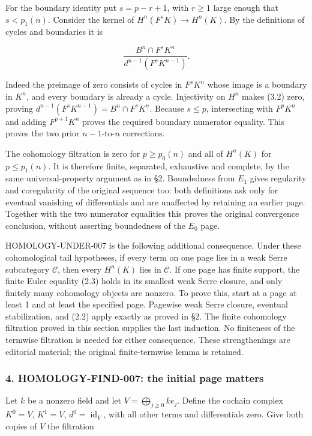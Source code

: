 \documentclass[11pt]{article}
\begin{document}
For the boundary identity put \(s=p-r+1\), with \(r\geq1\) large enough that \(s<p_1(n)\). Consider the kernel of \(H^n(F^sK)\to H^n(K)\). By the definitions of cycles and boundaries it is

\[
\frac{B^n\cap F^sK^n}{d^{n-1}(F^sK^{n-1})}.       \tag{3.2}
\]

Indeed the preimage of zero consists of cycles in \(F^sK^n\) whose image is a boundary in \(K^n\), and every boundary is already a cycle. Injectivity on \(H^n\) makes (3.2) zero, proving \(d^{n-1}(F^sK^{n-1})=B^n\cap F^sK^n\). Because \(s\leq p\), intersecting with \(F^pK^n\) and adding \(F^{p+1}K^n\) proves the required boundary numerator equality. This proves the two prior \(n-1\)-to-\(n\) corrections.

The cohomology filtration is zero for \(p\geq p_0(n)\) and all of \(H^n(K)\) for \(p\leq p_1(n)\). It is therefore finite, separated, exhaustive and complete, by the same universal-property argument as in §2. Boundedness from \(E_1\) gives regularity and coregularity of the original sequence too: both definitions ask only for eventual vanishing of differentials and are unaffected by retaining an earlier page. Together with the two numerator equalities this proves the original convergence conclusion, without asserting boundedness of the \(E_0\) page.

HOMOLOGY-UNDER-007 is the following additional consequence. Under these cohomological tail hypotheses, if every term on one page lies in a weak Serre subcategory \(\mathcal C\), then every \(H^n(K)\) lies in \(\mathcal C\). If one page has finite support, the finite Euler equality (2.3) holds in its smallest weak Serre closure, and only finitely many cohomology objects are nonzero. To prove this, start at a page at least 1 and at least the specified page. Pagewise weak Serre closure, eventual stabilization, and (2.2) apply exactly as proved in §2. The finite cohomology filtration proved in this section supplies the last induction. No finiteness of the termwise filtration is needed for either consequence. These strengthenings are editorial material; the original finite-termwise lemma is retained.

\subsubsection{4. HOMOLOGY-FIND-007: the initial page matters}\label{homology-find-007-the-initial-page-matters}

Let \(k\) be a nonzero field and let \(V=\bigoplus_{j\geq0}ke_j\). Define the cochain complex \(K^0=V\), \(K^1=V\), \(d^0=\operatorname{id}_V\), with all other terms and differentials zero. Give both copies of \(V\) the filtration
\end{document}
